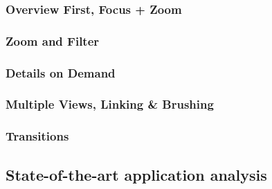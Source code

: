 \subsubsection{Overview First, Focus + Zoom}

\subsubsection{Zoom and Filter}

\subsubsection{Details on Demand}

\subsubsection{Multiple Views, Linking \& Brushing}

\subsubsection{Transitions}

\subsection{State-of-the-art application analysis}





